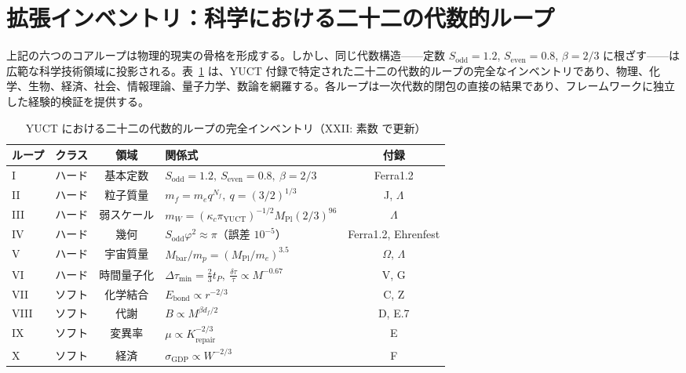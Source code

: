 \documentclass[12pt,a4paper]{article}
\begin{document}
	\section*{拡張インベントリ：科学における二十二の代数的ループ}
	
	上記の六つのコアループは物理的現実の骨格を形成する。しかし、同じ代数構造——定数 \(S_{\mathrm{odd}} = 1.2\), \(S_{\mathrm{even}} = 0.8\), \(\beta = 2/3\) に根ざす——は広範な科学技術領域に投影される。表~\ref{tab:all-loops-22} は、YUCT 付録で特定された二十二の代数的ループの完全なインベントリであり、物理、化学、生物、経済、社会、情報理論、量子力学、数論を網羅する。各ループは一次代数的閉包の直接の結果であり、フレームワークに独立した経験的検証を提供する。
	
\begin{table}[htbp]
	\centering
	\footnotesize
	\setlength{\tabcolsep}{8.5pt}
	\caption{YUCT における二十二の代数的ループの完全インベントリ（XXII: 素数 で更新）}
	\label{tab:all-loops-22}
	\begin{tabular}{l c c p{3.8cm} c}
		\toprule
		\textbf{ループ} & \textbf{クラス} & \textbf{領域} & \textbf{関係式} & \textbf{付録} \\
		\midrule
		I   & ハード & 基本定数 & \(S_{\mathrm{odd}}=1.2,\ S_{\mathrm{even}}=0.8,\ \beta=2/3\) & Ferra1.2 \\
		II  & ハード & 粒子質量 & \(m_f = m_e q^{N_f},\ q=(3/2)^{1/3}\) & J, \(\Lambda\) \\
		III & ハード & 弱スケール & \(m_W = (\kappa_c \pi_{\mathrm{YUCT}})^{-1/2} M_{\mathrm{Pl}} (2/3)^{96}\) & \(\Lambda\) \\
		IV  & ハード & 幾何 & \(S_{\mathrm{odd}}\varphi^2 \approx \pi\)（誤差 \(10^{-5}\)） & Ferra1.2, Ehrenfest \\
		V   & ハード & 宇宙質量 & \(M_{\mathrm{bar}}/m_p = (M_{\mathrm{Pl}}/m_e)^{3.5}\) & \(\Omega\), \(\Lambda\) \\
		VI  & ハード & 時間量子化 & \(\Delta\tau_{\min} = \frac{2}{3}t_P,\ \frac{\delta\tau}{\tau} \propto M^{-0.67}\) & V, G \\
		VII & ソフト & 化学結合 & \(E_{\mathrm{bond}} \propto r^{-2/3}\) & C, Z \\
		VIII& ソフト & 代謝 & \(B \propto M^{\beta d_f/2}\) & D, E.7 \\
		IX  & ソフト & 変異率 & \(\mu \propto K_{\mathrm{repair}}^{-2/3}\) & E \\
		X   & ソフト & 経済 & \(\sigma_{\mathrm{GDP}} \propto W^{-2/3}\) & F \\

\end{tabular}
\end{table}
\end{document}
